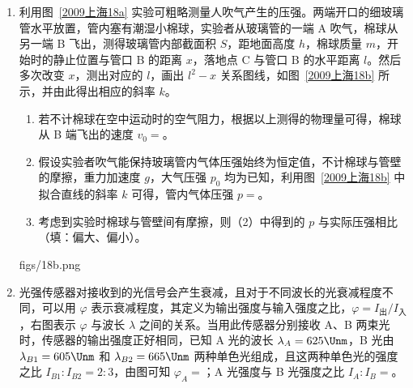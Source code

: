 \documentclass[\gkver]{gaokaozhenti}
\begin{document}
\begin{enumerate}
\item
利用图~\ref{2009上海18a} 实验可粗略测量人吹气产生的压强。两端开口的细玻璃管水平放置，管内塞有潮湿小棉球，实验者从玻璃管的一端 A 吹气，棉球从另一端 B 飞出，测得玻璃管内部截面积 $S$，距地面高度 $h$，棉球质量 $m$，开始时的静止位置与管口 B 的距离 $x$，落地点 C 与管口 B 的水平距离 $l$。然后多次改变 $x$，测出对应的 $l$，画出 $l^{2}-x$ 关系图线，如图~\ref{2009上海18b} 所示，并由此得出相应的斜率 $k$。
\begin{enumerate}
	\item
	若不计棉球在空中运动时的空气阻力，根据以上测得的物理量可得，棉球从 B 端飞出的速度 $v_{0} =$。
	\item
	假设实验者吹气能保持玻璃管内气体压强始终为恒定值，不计棉球与管壁的摩擦，重力加速度 $g$，大气压强 $p_{0}$ 均为已知，利用图~\ref{2009上海18b} 中拟合直线的斜率 $k$ 可得，管内气体压强 $p =$。
	\item
	考虑到实验时棉球与管壁间有摩擦，则（2）中得到的 $p$ 与实际压强相比（填：偏大、偏小）。
\end{enumerate}
{figs/18b.png}

\item
光强传感器对接收到的光信号会产生衰减，且对于不同波长的光衰减程度不同，可以用 $\varphi$ 表示衰减程度，其定义为输出强度与输入强度之比，$\varphi = I_{\text{出}}/I_{\text{入}}$，右图表示 $\varphi$ 与波长 $\lambda$ 之间的关系。当用此传感器分别接收 A、B 两束光时，传感器的输出强度正好相同，已知 A 光的波长 $\lambda_{A} = 625\Unm$，B 光由 $\lambda_{B1} = 605\Unm$ 和 $\lambda_{B2} = 665\Unm$ 两种单色光组成，且这两种单色光的强度之比 $I_{B1}:I_{B2} = 2:3$，由图可知 $\varphi_{A} =$；A 光强度与 B 光强度之比 $I_{A}:I_{B} =$。
\onepicture[align=right, w=7.39cm]{}
\end{enumerate}
\end{document}
